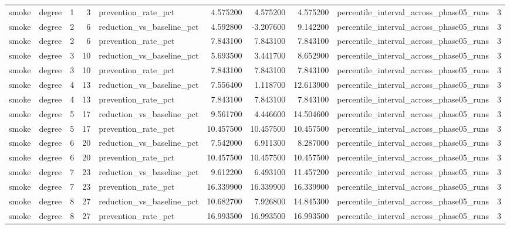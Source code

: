 \begin{tabular}{llrrlrrrlr}
smoke & degree & 1 & 3 & prevention\_rate\_pct & 4.575200 & 4.575200 & 4.575200 & percentile\_interval\_across\_phase05\_runs & 3 \\
smoke & degree & 2 & 6 & reduction\_vs\_baseline\_pct & 4.592800 & -3.207600 & 9.142200 & percentile\_interval\_across\_phase05\_runs & 3 \\
smoke & degree & 2 & 6 & prevention\_rate\_pct & 7.843100 & 7.843100 & 7.843100 & percentile\_interval\_across\_phase05\_runs & 3 \\
smoke & degree & 3 & 10 & reduction\_vs\_baseline\_pct & 5.693500 & 3.441700 & 8.652900 & percentile\_interval\_across\_phase05\_runs & 3 \\
smoke & degree & 3 & 10 & prevention\_rate\_pct & 7.843100 & 7.843100 & 7.843100 & percentile\_interval\_across\_phase05\_runs & 3 \\
smoke & degree & 4 & 13 & reduction\_vs\_baseline\_pct & 7.556400 & 1.118700 & 12.613900 & percentile\_interval\_across\_phase05\_runs & 3 \\
smoke & degree & 4 & 13 & prevention\_rate\_pct & 7.843100 & 7.843100 & 7.843100 & percentile\_interval\_across\_phase05\_runs & 3 \\
smoke & degree & 5 & 17 & reduction\_vs\_baseline\_pct & 9.561700 & 4.446600 & 14.504600 & percentile\_interval\_across\_phase05\_runs & 3 \\
smoke & degree & 5 & 17 & prevention\_rate\_pct & 10.457500 & 10.457500 & 10.457500 & percentile\_interval\_across\_phase05\_runs & 3 \\
smoke & degree & 6 & 20 & reduction\_vs\_baseline\_pct & 7.542000 & 6.911300 & 8.287000 & percentile\_interval\_across\_phase05\_runs & 3 \\
smoke & degree & 6 & 20 & prevention\_rate\_pct & 10.457500 & 10.457500 & 10.457500 & percentile\_interval\_across\_phase05\_runs & 3 \\
smoke & degree & 7 & 23 & reduction\_vs\_baseline\_pct & 9.612200 & 6.493100 & 11.457200 & percentile\_interval\_across\_phase05\_runs & 3 \\
smoke & degree & 7 & 23 & prevention\_rate\_pct & 16.339900 & 16.339900 & 16.339900 & percentile\_interval\_across\_phase05\_runs & 3 \\
smoke & degree & 8 & 27 & reduction\_vs\_baseline\_pct & 10.682700 & 7.926800 & 14.845300 & percentile\_interval\_across\_phase05\_runs & 3 \\
smoke & degree & 8 & 27 & prevention\_rate\_pct & 16.993500 & 16.993500 & 16.993500 & percentile\_interval\_across\_phase05\_runs & 3 \\

\end{tabular}
